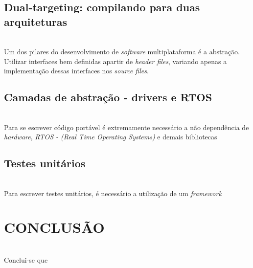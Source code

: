 \documentclass[times, twoside, watermark]{artigo}
\begin{document}
\subsection{Dual-targeting: compilando para duas arquiteturas}\hfill\\

Um dos pilares do desenvolvimento de \textit{software} multiplataforma é a abstração.
Utilizar interfaces bem definidas apartir de \textit{header files}, variando apenas
a implementação dessas interfaces nos \textit{source files}.

\subsection{Camadas de abstração - drivers e RTOS}\hfill\\

Para se escrever código portável é extremamente necessário a não dependência de 
\textit{hardware}, \textit{RTOS - (Real Time Operating Systems)} e demais bibliotecas

\subsection{Testes unitários}\hfill\\

Para escrever testes unitários, é necessário a utilização de um \textit{framework}


\section{CONCLUSÃO}\hfill\\
Conclui-se que 




\end{document}
